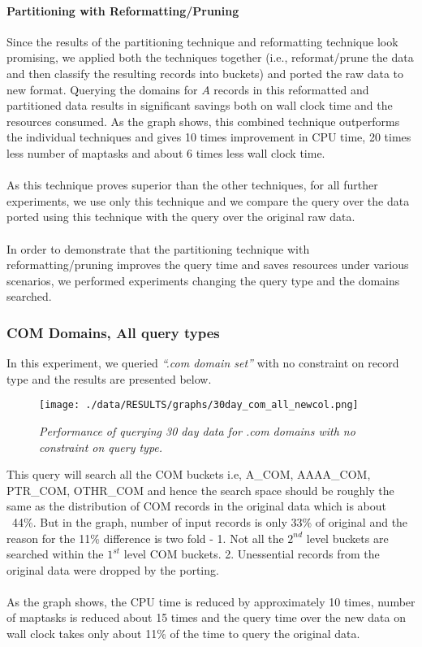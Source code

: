 \documentclass[11pt,a4paper]{article}
\begin{document}
\paragraph{Partitioning with Reformatting/Pruning} Since the results of the partitioning technique and reformatting technique look promising, we applied both the techniques together (i.e., reformat/prune the data and then classify the resulting records into buckets) and ported the raw data to new format. Querying the domains for $A$ records in this reformatted and partitioned data results in significant savings both on wall clock time and the resources consumed. As the graph shows, this combined technique outperforms the individual techniques and gives 10 times improvement in CPU time, 20 times less number of maptasks and about 6 times less wall clock time.
\\\\
As this technique proves superior than the other techniques, for all further experiments, we use only this technique and we compare the query over the data ported using this technique with the query over the original raw data.
\\\\
In order to demonstrate that the partitioning technique with reformatting/pruning improves the query time and saves resources under various scenarios, we performed experiments changing the query type and the domains searched.

\subsubsection{COM Domains, All query types}
In this experiment, we queried \textit{``.com domain set''} with no constraint on record type and the results are presented below.

\begin{figure}[H] 
\centering
\texttt{[image: ./data/RESULTS/graphs/30day\_com\_all\_newcol.png]}
\caption {\textit{Performance of querying 30 day data for .com domains with no constraint on query type.}}
\end{figure}

\noindent
This query will search all the COM buckets i.e, A\_COM, AAAA\_COM, PTR\_COM, OTHR\_COM and hence the search space should be roughly the same as the distribution of COM records in the original data which is about ~44\%. But in the graph, number of input records is only 33\% of original and the reason for the 11\% difference is two fold - 1. Not all the $2^{nd}$ level buckets are searched within the $1^{st}$ level COM buckets. 2. Unessential records from the original data were dropped by the porting.
\\\\
As the graph shows, the CPU time is reduced by approximately 10 times, number of maptasks is reduced about 15 times and the query time over the new data on wall clock takes only about 11\% of the time to query the original data.
\end{document}
